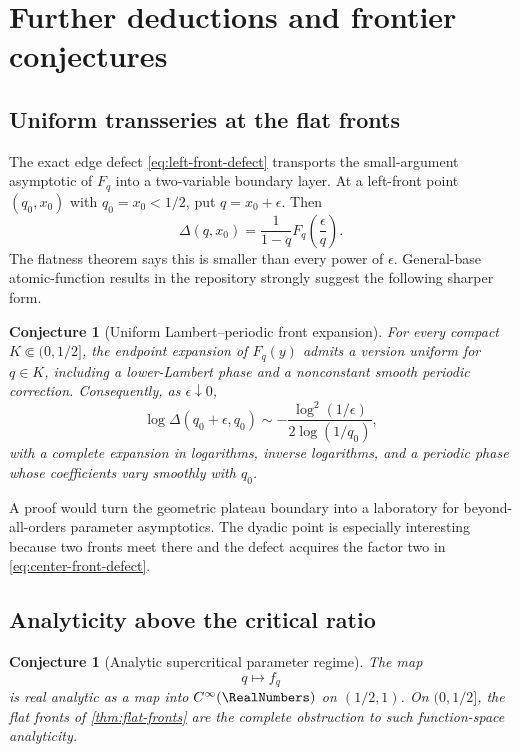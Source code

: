\documentclass[11pt,oneside]{article}
\newtheorem{conjecture}[theorem]{Conjecture}
\theoremstyle{definition}
\theoremstyle{remark}
\begin{document}
\section{Further deductions and frontier conjectures}
\label{sec:conjectures}

\subsection{Uniform transseries at the flat fronts}

The exact edge defect \eqref{eq:left-front-defect} transports the small-argument asymptotic of
\(F_q\) into a two-variable boundary layer.  At a left-front point \((q_0,x_0)\) with
\(q_0=x_0<1/2\), put \(q=x_0+\epsilon\).  Then
\[
 \Delta(q,x_0)=\frac1{1-q}
 F_q\!\left(\frac{\epsilon}{q}\right).
\]
The flatness theorem says this is smaller than every power of \(\epsilon\).  General-base
atomic-function results in the repository strongly suggest the following sharper form.

\begin{conjecture}[Uniform Lambert--periodic front expansion]
\label{conj:front-transseries}
For every compact \(K\Subset(0,1/2]\), the endpoint expansion of \(F_q(y)\) admits a version
uniform for \(q\in K\), including a lower-Lambert phase and a nonconstant smooth periodic
correction.  Consequently, as \(\epsilon\downarrow0\),
\begin{equation}
 \log\Delta(q_0+\epsilon,q_0)
 \sim-\frac{\log^2(1/\epsilon)}{2\log(1/q_0)},
 \label{eq:front-leading-conjecture}
\end{equation}
with a complete expansion in logarithms, inverse logarithms, and a periodic phase whose
coefficients vary smoothly with \(q_0\).
\end{conjecture}

A proof would turn the geometric plateau boundary into a laboratory for beyond-all-orders
parameter asymptotics.  The dyadic point is especially interesting because two fronts meet
there and the defect acquires the factor two in \eqref{eq:center-front-defect}.

\subsection{Analyticity above the critical ratio}

\begin{conjecture}[Analytic supercritical parameter regime]
\label{conj:supercritical-analytic}
The map
\[
 q\longmapsto f_q
\]
is real analytic as a map into \(C^\infty(\RealNumbers)\) on \((1/2,1)\).  On \((0,1/2]\), the flat
fronts of \cref{thm:flat-fronts} are the complete obstruction to such function-space
analyticity.
\end{conjecture}
\end{document}

